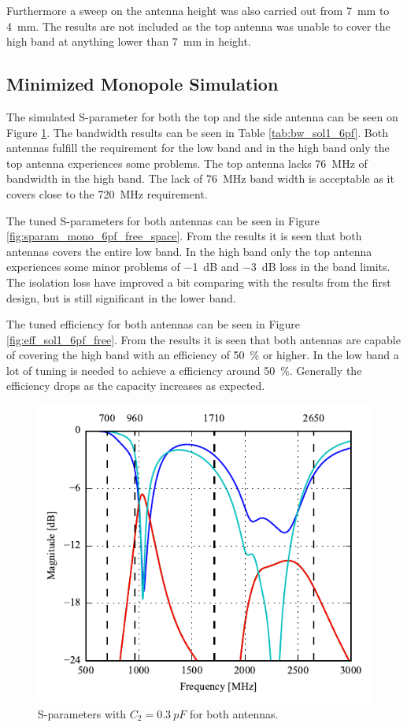 Furthermore a sweep on the antenna height was also carried out from \SI{7}{mm} to \SI{4}{mm}. The results are not included as the top antenna was unable to cover the high band at anything lower than \SI{7}{mm} in height.

\subsection{Minimized Monopole Simulation}

The simulated S-parameter for both the top and the side antenna can be seen on Figure \ref{fig:ant1_6pf_sparam}. The bandwidth results can be seen in Table \ref{tab:bw_sol1_6pf}. Both antennas fulfill the requirement for the low band and in the high band only the top antenna experiences some problems. The top antenna lacks \SI{76}{MHz} of bandwidth in the high band. The lack of \SI{76}{MHz} band width is acceptable as it covers close to the \SI{720}{MHz} requirement.

The tuned S-parameters for both antennas can be seen in Figure \ref{fig:sparam_mono_6pf_free_space}. From the results it is seen that both antennas covers the entire low band. In the high band only the top antenna experiences some minor problems of \SI{-1}{dB} and \SI{-3}{dB} loss in the band limits. The isolation loss have improved a bit comparing with the results from the first design, but is still significant in the lower band.     

The tuned efficiency for both antennas can be seen in Figure \ref{fig:eff_sol1_6pf_free}. From the results it is seen that both antennas are capable of covering the high band with an efficiency of \SI{50}{\percent} or higher. In the low band a lot of tuning is needed to achieve a efficiency around \SI{50}{\percent}. Generally the efficiency drops as the capacity increases as expected.  

\begin{figure}[htbp]
    \centering
    \includegraphics{img/tech_sol/monopole/5mm/sweep_5mm}
    \caption{S-parameters with $C_2=\SI{0.3}{pF}$ for both antennas.}
    \label{fig:ant1_6pf_sparam}
\end{figure}

